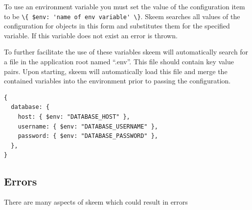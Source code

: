 \documentclass[
  12pt,
]{article}
\newcommand{\passthrough}[1]{#1}
\begin{document}
To use an environment variable you must set the value of the
configuration item to be
\passthrough{\lstinline!\{ $env: 'name of env variable' \}!}. Skeem
searches all values of the configuration for objects in this form and
substitutes them for the specified variable. If this variable does not
exist an error is thrown.

To further facilitate the use of these variables skeem will
automatically search for a file in the application root named ``.env''.
This file should contain key value pairs. Upon starting, skeem will
automatically load this file and merge the contained variables into the
environment prior to passing the configuration.

\begin{lstlisting}[caption={Configuration which uses enviroment variables to avoid exposing critical infomation}]
{
  database: {
    host: { $env: "DATABASE_HOST" },
    username: { $env: "DATABASE_USERNAME" },
    password: { $env: "DATABASE_PASSWORD" },
  },
}
\end{lstlisting}

\hypertarget{errors}{%
\subsection{Errors}\label{errors}}

There are many aspects of skeem which could result in errors
\end{document}
